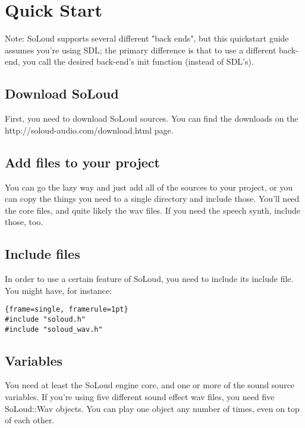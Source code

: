 
\chapter{Quick Start}

Note: SoLoud supports several different "back ends", but this quickstart guide assumes you're using SDL; the primary difference is that to use a different back-end, you call the desired back-end's init function (instead of SDL's).

\section{Download SoLoud}

First, you need to download SoLoud sources. You can find the downloads on the http://soloud-audio.com/download.html page.

\section{Add files to your project}

You can go the lazy way and just add all of the sources to your project, or you can copy the things you need to a single directory and include those. You'll need the core files, and quite likely the wav files. If you need the speech synth, include those, too.

\section{Include files}

In order to use a certain feature of SoLoud, you need to include its include file. You might have, for instance:

\begin{lstlisting}{frame=single, framerule=1pt}
#include "soloud.h"
#include "soloud_wav.h"
\end{lstlisting}

\section{Variables}

You need at least the SoLoud engine core, and one or more of the sound source variables. If you're using five different sound effect wav files, you need five SoLoud::Wav objects. You can play one object any number of times, even on top of each other.

